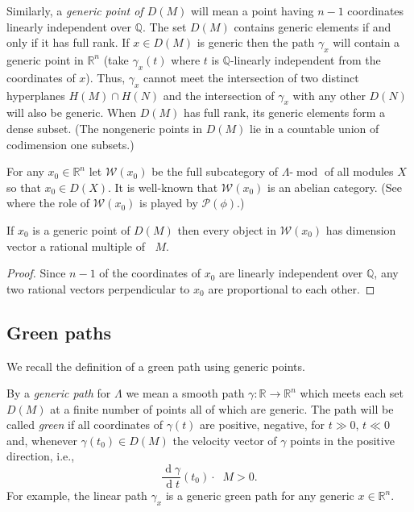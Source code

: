 \documentclass[ALCO,ThmDefs,Unicode,epreuves]{cedram}
\DeclareMathOperator{\undim}{\underline{dim}}
\DeclareMathOperator{\modr}{mod}
\DeclareMathOperator{\dd}{d}
\newcommand{\field}[1]{\mathbb{#1}}
\newcommand{\RR}{\ensuremath{{\field{R}}}}
\newcommand{\QQ}{\ensuremath{{\field{Q}}}}
\newcommand{\cP}{\ensuremath{{\mathcal{P}}}}
\newcommand{\cW}{\ensuremath{{\mathcal{W}}}}
\begin{document}
Similarly, a \emph{generic point of $D(M)$} will mean a point having $n-1$ coordinates linearly independent over $\QQ$. The set $D(M)$ contains generic elements if and only if it has full rank. If $x\in D(M)$ is generic then the path $\gamma_x$ will contain a generic point in $\RR^n$ (take $\gamma_x(t)$ where $t$ is $\QQ$-linearly independent from the coordinates of $x$). Thus, $\gamma_x$ cannot meet the intersection of two distinct hyperplanes $H(M)\cap H(N)$ and the intersection of $\gamma_x$ with any other $D(N)$ will also be generic. When $D(M)$ has full rank, its generic elements form a dense subset. (The nongeneric points in $D(M)$ lie in a countable union of codimension one subsets.)

For any $x_0\in \RR^n$ let $\cW(x_0)$ be the full subcategory of $\Lambda$-$\modr$ of all modules $X$ so that $x_0\in D(X)$. It is well-known that $\cW(x_0)$ is an abelian category. (See~\cite[Lemma~5.2]{Bridgeland} where the role of $\cW(x_0)$ is played by $\cP(\phi)$.)%

\begin{prop}\label{prop: generic x means W(x) has only one vector}
If $x_0$ is a generic point of $D(M)$ then every object in $\cW(x_0)$ has dimension vector a rational multiple of $\undim M$.
\end{prop}

\begin{proof}
Since $n-1$ of the coordinates of $x_0$ are linearly independent over $\QQ$, any two rational vectors perpendicular to $x_0$ are proportional to each other.
\end{proof}

\subsection{Green paths} We recall the definition of a green path using generic points.

\begin{defi}\label{def: green path}
By a \emph{generic path} for $\Lambda$ we mean a smooth path $\gamma:\RR\to\RR^n$ which meets each set $D(M)$ at a finite number of points all of which are generic. The path will be called \emph{green} if all coordinates of $\gamma(t)$ are positive, \resp  negative, for $t\gg 0$, \resp  $t\ll 0$ and, whenever $\gamma(t_0)\in D(M)$ the velocity vector of $\gamma$ points in the positive direction, i.e.,
\[
	\frac {\dd \gamma}{\dd t}(t_0)\cdot \undim M>0.
\]
For example, the linear path $\gamma_x$ is a generic green path for any generic $x\in\RR^n$.
\end{defi}
\end{document}
